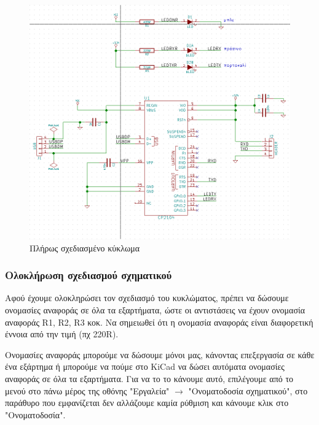 \documentclass[a4paper]{article}
\begin{document}
\begin{figure}
  \begin{center}
    \includegraphics{img/final-schem.png}
    \caption{Πλήρως σχεδιασμένο κύκλωμα}
    \label{fig:final-schem}
  \end{center}
\end{figure}

\subsubsection{Ολοκλήρωση σχεδιασμού σχηματικού}
Αφού έχουμε ολοκληρώσει τον σχεδιασμό του κυκλώματος, πρέπει να δώσουμε ονομασίες αναφοράς σε όλα τα εξαρτήματα, ώστε οι αντιστάσεις να έχουν ονομασία αναφοράς R1, R2, R3 κοκ. Να σημειωθεί ότι η ονομασία αναφοράς είναι διαφορετική έννοια από την τιμή (πχ 220R). 

Ονομασίες αναφοράς μπορούμε να δώσουμε μόνοι μας, κάνοντας επεξεργασία σε κάθε ένα εξάρτημα ή μπορούμε να πούμε στο \textenglish{KiCad} να δώσει αυτόματα ονομασίες αναφοράς σε όλα τα εξαρτήματα. Για να το το κάνουμε αυτό, επιλέγουμε από το μενού στο πάνω μέρος της οθόνης "Εργαλεία" $\rightarrow$ "Ονοματοδοσία σχηματικού", στο παράθυρο που εμφανίζεται δεν αλλάζουμε καμία ρύθμιση και κάνουμε κλικ στο "Ονοματοδοσία".

\begin{figure}
  \begin{center}
    \label{fig:kicad-main}
  \end{center}
\end{figure}
\end{document}
